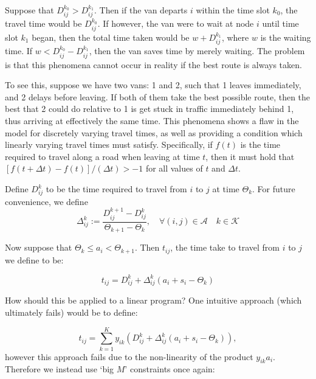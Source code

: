 Suppose that $D^{k_0}_{ij} > D^{k_1}_{ij}$. Then if the van departs $i$ within the time slot $k_0$, the travel time would be $D^{k_0}_{ij}$. If however, the van were to wait at node $i$ until time slot $k_1$ began, then the total time taken would be $w + D^{k_1}_{ij}$, where $w$ is the waiting time. If $w < D^{k_0}_{ij} - D^{k_1}_{ij}$, then the van saves time by merely waiting. The problem is that this phenomena cannot occur in reality if the best route is always taken. 

To see this, suppose we have two vans: 1 and 2, such that 1 leaves immediately, and 2 delays before leaving. If both of them take the best possible route, then the best that 2 could do relative to 1 is get stuck in traffic immediately behind 1, thus arriving at effectively the same time. This phenomena shows a flaw in the model for discretely varying travel times, as well as providing a condition which linearly varying travel times must satisfy. Specifically, if $f(t)$ is the time required to travel along a road when leaving at time $t$, then it must hold that $[f(t+ \Delta t)-f(t)]/(\Delta t ) > -1$ for all values of $t$ and $\Delta t$.

Define $D^k_{ij}$ to be the time required to travel from $i$ to $j$ at time $\Theta_k$. For future convenience, we define 
\begin{equation}
\Delta^k_{ij} := \frac{D^{k+1}_{ij} - D^k_{ij}}{\Theta_{k+1} - \Theta_k}, \quad \forall (i,j) \in \mathcal{A}\quad k \in \mathcal{K}
\end{equation}

Now suppose that $\Theta_k \leq a_i < \Theta_{k+1}$. Then $t_{ij}$, the time take to travel from $i$ to $j$ we define to be:

\begin{equation}
\label{eq:linear_travel_times_def}
t_{ij} = D^k_{ij} + \Delta^k_{ij} \left( a_i + s_i -\Theta_k\right)
\end{equation} 

How should this be applied to a linear program? One intuitive approach (which ultimately fails) would be to define:

\begin{equation}
\label{eq:linear_travel_times_def2}
t_{ij} = \sum \limits_{k = 1}^K y_{ik} \left(D^k_{ij} + \Delta^k_{ij} \left( a_i + s_i -\Theta_k\right)\right),
\end{equation} 
however this approach fails due to the non-linearity of the product $y_{ik} a_i$. Therefore we instead use `big $M$' constraints once again:

